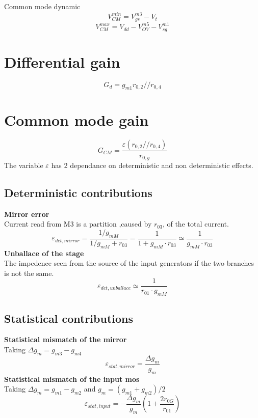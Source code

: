 Common mode dynamic
\begin{equation}
V_{CM}^{min}=V_{gs}^{m3}-V_t 
\end{equation}
\begin{equation}
V_{CM}^{max}=V_{dd}-V_{OV}^{m5}-V_{sg}^{m1}
\end{equation}

\section{Differential gain}
\begin{equation}
G_d=g_{m1}r_{0,2}//r_{0,4}
\end{equation}

\section{Common mode gain}
\begin{equation}
G_{CM}=\frac{\varepsilon(r_{0,2}//r_{0,4})}{r_{0,g}}
\end{equation}
The variable $\varepsilon$ has 2 dependance on deterministic and non deterministic effects.

\subsection{Deterministic contributions}
{\bf Mirror error}\\
Current read from M3 is a partition ,caused by $r_03$, of the total current.
\begin{equation}
\varepsilon_{det,mirror}=\frac{1/g_{mM}}{1/g_{mM}+r_{03}}=\frac{1}{1+g_{mM}\cdot r_{03}}\simeq \frac{1}{g_{mM}\cdot r_{03}}
\end{equation}
{\bf Unballace of the stage}\\
The impedence seen from the source of the input generators if the two branches is not the same.
\begin{equation}
\varepsilon_{det,unballace}\simeq \frac{1}{r_{01}\cdot g_{mM}}
\end{equation}

\subsection{Statistical contributions}
{\bf Statistical mismatch of the mirror}\\
Taking $\Delta g_{m}=g_{m3}-g_{m4}$ 
\begin{equation}
\varepsilon_{stat,mirror}=\frac{\Delta g_{m}}{g_{m}}
\end{equation}
{\bf Statistical mismatch of the input mos}\\
Taking $\Delta g_{m}=g_{m1}-g_{m2}$ and $g_{m}=(g_{m1}+g_{m2})/2$
\begin{equation}
\varepsilon_{stat,input}=-\frac{\Delta g_{m}}{g_{m}}(1+\frac{2r_{0G}}{r_{01}})
\end{equation}


